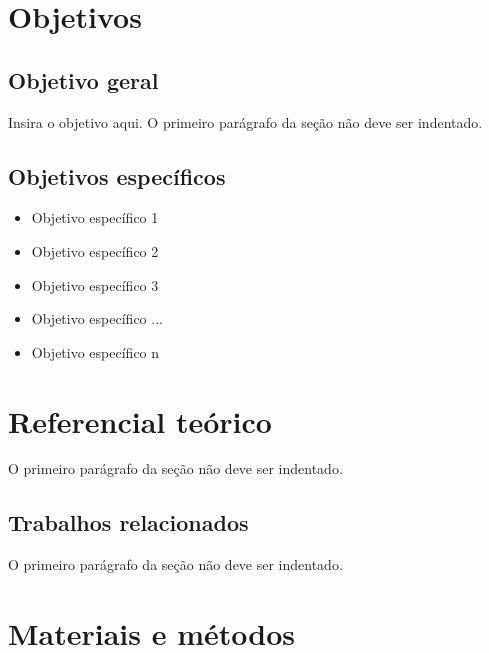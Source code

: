 \documentclass[
	12pt,				%
	openright,			%
	oneside,			%
	a4paper,			%
	english,			%
	brazil				%
	]{abntex2}
\begin{document}


\chapter{Objetivos}\label{cap_trabalho_academico}

\section{Objetivo geral}

\noindent Insira o objetivo aqui. O primeiro parágrafo da seção não deve ser indentado.


\section{Objetivos específicos}

\begin{itemize}

\item Objetivo específico 1
\item Objetivo específico 2
\item Objetivo específico 3
\item Objetivo específico ...
\item Objetivo específico n
\end{itemize}


\chapter{Referencial teórico}
\noindent O primeiro parágrafo da seção não deve ser indentado.

\lipsum[1]  %


\section{Trabalhos relacionados}

\noindent O primeiro parágrafo da seção não deve ser indentado.

\lipsum[2-3] %


\chapter{Materiais e métodos}
\end{document}
